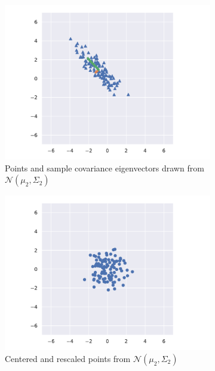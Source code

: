 \documentclass[11pt,letterpaper]{article}
\numberwithin{equation}{section}
\numberwithin{figure}{section}
\begin{document}
\begin{figure}[p]
\begin{subfigure}[t]{0.49\textwidth}
	\centering
	\includegraphics[width=\textwidth]{figures/unscale_plot_2.pdf}
	\caption{Points and sample covariance eigenvectors drawn from $\mathcal{N}(\mu_2,\Sigma_2)$}
\end{subfigure}
%
\begin{subfigure}[t]{0.49\textwidth}
	\centering
	\includegraphics[width=\textwidth]{figures/scale_plot_2.pdf}
	\caption{Centered and rescaled points from $\mathcal{N}(\mu_2,\Sigma_2)$}
\end{subfigure}
\\
\begin{subfigure}[t]{0.49\textwidth}
	\centering

\end{subfigure}
\end{figure}
\end{document}
